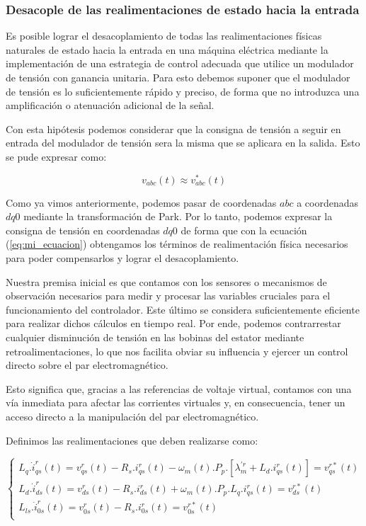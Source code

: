 \documentclass{article}
\begin{document}

\subsubsection{Desacople de las realimentaciones de estado hacia la entrada}

Es posible lograr el desacoplamiento de todas las realimentaciones físicas naturales de 
estado hacia la entrada en una máquina eléctrica mediante la implementación de una estrategia 
de control adecuada que utilice un modulador de tensión con ganancia unitaria. Para esto debemos 
suponer que el modulador de tensión es lo suficientemente rápido y preciso, de forma que no 
introduzca una amplificación o atenuación adicional de la señal. 

Con esta hipótesis podemos considerar que la consigna de tensión a seguir en entrada del modulador 
de tensión sera la misma que se aplicara en la salida. Esto se pude expresar como: 

\begin{equation}
    v_{abc}(t) \approx v^*_{abc}(t)
\end{equation}

Como ya vimos anteriormente, podemos pasar de coordenadas $abc$ a coordenadas $dq0$ mediante la
transformación de Park. Por lo tanto, podemos expresar la consigna de tensión en coordenadas $dq0$
de forma que con la ecuación (\ref{eq:mi_ecuacion}) obtengamos los términos de  realimentación física 
necesarios para poder compensarlos y lograr el desacoplamiento.

Nuestra premisa inicial es que contamos con los sensores o mecanismos de observación necesarios para 
medir y procesar las variables cruciales para el funcionamiento del controlador. Este último se 
considera suficientemente eficiente para realizar dichos cálculos en tiempo real. Por ende, podemos 
contrarrestar cualquier disminución de tensión en las bobinas del estator mediante retroalimentaciones, 
lo que nos facilita obviar su influencia y ejercer un control directo sobre el par electromagnético.

Esto significa que, gracias a las referencias de voltaje virtual, contamos con una vía inmediata para 
afectar las corrientes virtuales y, en consecuencia, tener un acceso directo a la manipulación del par 
electromagnético.

Definimos las realimentaciones que deben realizarse como:

\begin{equation}\label{eq:compensaciones}
    \begin{cases}
        L_q.\dot{i}^r_{qs}(t) = v^{r}_{qs}(t) - R_{s}.i_{qs}^r(t) - \omega_m(t).P_p.[\lambda^{\prime r}_m + L_d.i_{qs}^r(t)] = v^{r*}_{qs}(t)\\
        L_d.\dot{i}^r_{ds}(t) = v^{r}_{ds}(t) - R_{s}.i_{ds}^r(t) + \omega_m(t).P_p.L_q.i_{qs}^r(t) = v^{r*}_{ds}(t)\\
        L_{ls}.\dot{i}^r_{0s}(t) = v^{r}_{0s}(t) - R_{s}.i_{0s}^r(t) = v^{r*}_{0s}(t)\\
    \end{cases}
\end{equation}
\end{document}
